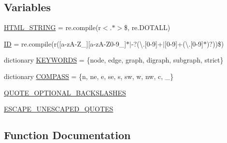 \subsection*{Variables}
\begin{DoxyCompactItemize}
\item 
\hyperlink{namespacegraphviz_1_1lang_a678f34810a83ac5938ae5d79f05eb791}{H\+T\+M\+L\+\_\+\+S\+T\+R\+I\+NG} = re.\+compile(r\textquotesingle{}$<$.$\ast$$>$\$\textquotesingle{}, re.\+D\+O\+T\+A\+LL)
\item 
\hyperlink{namespacegraphviz_1_1lang_aecc0f462996c2c3f6d51c49afe38726d}{ID} = re.\+compile(r\textquotesingle{}(\mbox{[}a-\/zA-\/Z\+\_\+\mbox{]}\mbox{[}a-\/zA-\/Z0-\/9\+\_\+\mbox{]}$\ast$$\vert$-\/?(\textbackslash{}.\mbox{[}0-\/9\mbox{]}+$\vert$\mbox{[}0-\/9\mbox{]}+(\textbackslash{}.\mbox{[}0-\/9\mbox{]}$\ast$)?))\$\textquotesingle{})
\item 
dictionary \hyperlink{namespacegraphviz_1_1lang_acdbd39ed827b17408842960347b5385c}{K\+E\+Y\+W\+O\+R\+DS} = \{\textquotesingle{}node\textquotesingle{}, \textquotesingle{}edge\textquotesingle{}, \textquotesingle{}graph\textquotesingle{}, \textquotesingle{}digraph\textquotesingle{}, \textquotesingle{}subgraph\textquotesingle{}, \textquotesingle{}strict\textquotesingle{}\}
\item 
dictionary \hyperlink{namespacegraphviz_1_1lang_a361126cef01a2106424fc2d06451dfe6}{C\+O\+M\+P\+A\+SS} = \{\textquotesingle{}n\textquotesingle{}, \textquotesingle{}ne\textquotesingle{}, \textquotesingle{}e\textquotesingle{}, \textquotesingle{}se\textquotesingle{}, \textquotesingle{}s\textquotesingle{}, \textquotesingle{}sw\textquotesingle{}, \textquotesingle{}w\textquotesingle{}, \textquotesingle{}nw\textquotesingle{}, \textquotesingle{}c\textquotesingle{}, \textquotesingle{}\+\_\+\textquotesingle{}\}
\item 
\hyperlink{namespacegraphviz_1_1lang_a42d6eccec1d66c0a13e8aa0536fb16ab}{Q\+U\+O\+T\+E\+\_\+\+O\+P\+T\+I\+O\+N\+A\+L\+\_\+\+B\+A\+C\+K\+S\+L\+A\+S\+H\+ES}
\item 
\hyperlink{namespacegraphviz_1_1lang_a0ae48bbf3e7923fd534b378316e6b1fa}{E\+S\+C\+A\+P\+E\+\_\+\+U\+N\+E\+S\+C\+A\+P\+E\+D\+\_\+\+Q\+U\+O\+T\+ES}
\end{DoxyCompactItemize}


\subsection{Function Documentation}
\mbox{\label{namespacegraphviz_1_1lang_a7cc7c98de63eca4bff562508715dcbfe}} 
